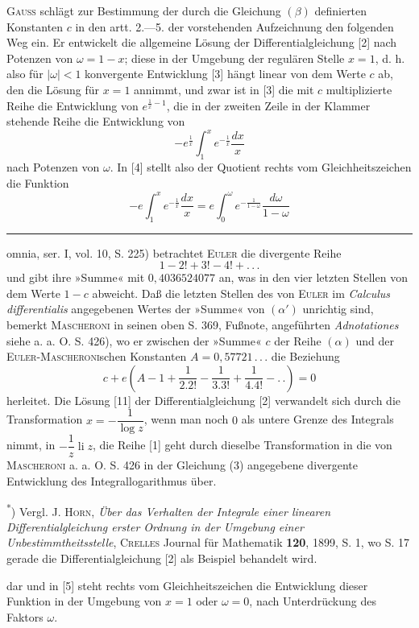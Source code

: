\indent\textsc{Gauss} schlägt zur Bestimmung der durch die Gleichung \((\beta)\) definierten Konstanten \(c\) in den artt. 2.—5. der vorstehenden Aufzeichnung den folgenden Weg ein. Er entwickelt die allgemeine Lösung der Differentialgleichung [2] nach Potenzen von \(\omega=1-x\); diese in der Umgebung der regulären Stelle \(x=1\), d. h. also für \(|\omega|<1\) konvergente Entwicklung [3] hängt linear von dem Werte \(c\) ab, den die Lösung für \(x=1\) annimmt, und zwar ist in [3] die mit \(c\) multiplizierte Reihe die Entwicklung von \(e^{\frac1x-1}\), die in der zweiten Zeile in der Klammer stehende Reihe die Entwicklung von
\[
-e^{\frac1x}\int_1^x e^{-\frac1x}\frac{dx}{x}
\]
\noindent nach Potenzen von \(\omega\). In [4] stellt also der Quotient rechts vom Gleichheitszeichen die Funktion
\begin{equation}
-e\int_1^x e^{-\frac1x}\frac{dx}{x}=e\int_0^\omega e^{-\frac1{1-\omega}}\frac{d\omega}{1-\omega}\tag*{(\(\delta\))}
\end{equation}
\par\medskip\noindent\rule{.24\linewidth}{.4pt}\par\smallskip
{\footnotesize
\noindent omnia, ser. I, vol. 10, S. 225) betrachtet \textsc{Euler} die divergente Reihe
\begin{equation}
1-2!+3!-4!+{.}\,{.}\,{.}\tag*{(\(\alpha'\))}
\end{equation}
\noindent und gibt ihre »Summe« mit \(0{,}4036524077\) an, was in den vier letzten Stellen von dem Werte \(1-c\) abweicht. Daß die letzten Stellen des von \textsc{Euler} im \textit{Calculus differentialis} angegebenen Wertes der »Summe« von \((\alpha')\) unrichtig sind, bemerkt \textsc{Mascheroni} in seinen oben S. 369, Fußnote, angeführten \textit{Adnotationes} siehe a. a. O. S. 426), wo er zwischen der »Summe« \(c\) der Reihe \((\alpha)\) und der \textsc{Euler-Mascheroni}schen Konstanten \(A=0{,}57721\,{.}\,{.}\,{.}\) die Beziehung
\[
c+e\left(A-1+\frac1{2{.}2!}-\frac1{3{.}3!}+\frac1{4{.}4!}-{.}\,{.}\right)=0
\]
\noindent herleitet. Die Lösung [11] der Differentialgleichung [2] verwandelt sich durch die Transformation \(x=-\dfrac1{\log z}\), wenn man noch \(0\) als untere Grenze des Integrals nimmt, in \(-\dfrac1z\operatorname{li}z\), die Reihe [1] geht durch dieselbe Transformation in die von \textsc{Mascheroni} a. a. O. S. 426 in der Gleichung (3) angegebene divergente Entwicklung des Integrallogarithmus über.
\par\noindent\hspace*{\parindent}\textsuperscript{*}) Vergl. J. \textsc{Horn}, \textit{Über das Verhalten der Integrale einer linearen Differentialgleichung erster Ordnung in der Umgebung einer Unbestimmtheitsstelle}, \textsc{Crelles} Journal für Mathematik \textbf{120}, 1899, S. 1, wo S. 17 gerade die Differentialgleichung [2] als Beispiel behandelt wird.
\par}
\clearpage{}
\noindent dar und in [5] steht rechts vom Gleichheitszeichen die Entwicklung dieser Funktion in der Umgebung von \(x=1\) oder \(\omega=0\), nach Unterdrückung des Faktors \(\omega\).

